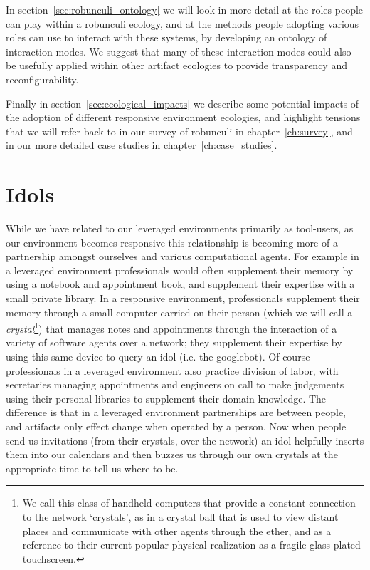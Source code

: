 In section~\ref{sec:robunculi_ontology} we will look in more detail at the roles people can play within a robunculi ecology, and at the methods people adopting various roles can use to interact with these systems, by developing an ontology of interaction modes. We suggest that many of these interaction modes could also be usefully applied within other artifact ecologies to provide transparency and reconfigurability.

Finally in section~\ref{sec:ecological_impacts} we describe some potential impacts of the adoption of different responsive environment ecologies, and highlight tensions that we will refer back to in our survey of robunculi in chapter~\ref{ch:survey}, and in our more detailed case studies in chapter~\ref{ch:case_studies}.

\section{Idols}
\label{sec:idols}
%
While we have related to our leveraged environments primarily as tool-users, as our environment becomes responsive this relationship is becoming more of a partnership amongst ourselves and various computational agents. 
For example in a leveraged environment professionals would often supplement their memory by using a notebook and appointment book, and supplement their expertise with a small private library. 
In a responsive environment, professionals supplement their memory through a small computer carried on their person (which we will call a \emph{crystal}\footnote{We call this class of handheld computers that provide a constant connection to the network `crystals', as in a crystal ball that is used to view distant places and communicate with other agents through the ether, and as a reference to their current popular physical realization as a fragile glass-plated touchscreen.}) that manages notes and appointments through the interaction of a variety of software agents over a network; they supplement their expertise by using this same device to query an idol (i.e. the googlebot).
Of course professionals in a leveraged environment also practice division of labor, with secretaries managing appointments and engineers on call to make judgements using their personal libraries to supplement their domain knowledge.
The difference is that in a leveraged environment partnerships are between people, and artifacts only effect change when operated by a person.
Now when people send us invitations (from their crystals, over the network) an idol helpfully inserts them into our calendars and then buzzes us through our own crystals at the appropriate time to tell us where to be.

